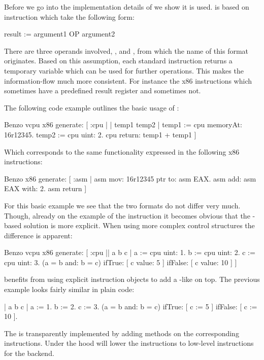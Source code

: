 Before we go into the implementation details of \VCPU we show it is used.
\VCPU is based on \TAC instruction which take the following form:
%
\begin{stcode}{}
result := argument1 OP argument2
\end{stcode}
%
There are three operands involved, ,  and , from which the name of this \TAC format originates.
Based on this assumption, each standard \VCPU instruction returns a temporary variable which can be used for further operations.
This makes the information-flow much more consistent.
For instance the x86 instructions which sometimes have a predefined result register and sometimes not.

The following code example outlines the basic usage of \VCPU:
%
\begin{stcode}[
	label={lst:benzo-problem-vcpu}, 
	caption={Basic \VCPU Example}
]{}
Benzo vcpu x86 generate: [ :cpu | | temp1 temp2 |
	temp1 := cpu memoryAt: 16r12345.
	temp2 := cpu uint: 2.
	cpu return: temp1 + temp1 ]
\end{stcode}
%
Which corresponds to the same functionality expressed in the following x86 instructions:
%
\begin{stcode}{}
Benzo x86 generate: [ :asm |
	asm mov: 16r12345 ptr to: asm EAX.
	asm add: asm EAX with: 2.
	asm return ]
\end{stcode}
%
For this basic example we see that the two formats do not differ very much.
Though, already on the example of the  instruction it becomes obvious that the \TAC-based solution is more explicit.
When using more complex control structures the difference is apparent:
\begin{stcode}{}
Benzo vcpu x86 generate: [ :cpu || a b c |
	a := cpu uint: 1.
	b := cpu uint: 2.
	c := cpu uint: 3.
	(a = b and: b = c) 
		ifTrue:  [ c value: 5  ] 
		ifFalse: [ c value: 10 ] ]
\end{stcode}
%
\VCPU benefits from using explicit instruction objects to add a \PH-like \DSL on top.
The previous example looks fairly similar in plain \PH code:
%
\begin{stcode}{}
| a b c |
a := 1.
b := 2.
c := 3.
(a = b and: b = c) 
	ifTrue:  [ c := 5  ] 
	ifFalse: [ c := 10 ].
\end{stcode}
%
The \DSL is transparently implemented by adding \PH methods on the corresponding \VCPU instructions.
Under the hood \VCPU will lower the \TAC instructions to low-level \ASM instructions for the \AsmJIT backend.


